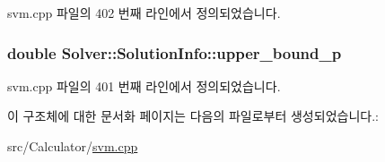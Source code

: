 svm.\+cpp 파일의 402 번째 라인에서 정의되었습니다.

\hypertarget{struct_solver_1_1_solution_info_a94c4cb7f402752326cc975ec57a8688f}{
\subsubsection[{upper\+\_\+bound\+\_\+p}]{\setlength{\rightskip}{0pt plus 5cm}double Solver\+::\+Solution\+Info\+::upper\+\_\+bound\+\_\+p}}\label{struct_solver_1_1_solution_info_a94c4cb7f402752326cc975ec57a8688f}


svm.\+cpp 파일의 401 번째 라인에서 정의되었습니다.



이 구조체에 대한 문서화 페이지는 다음의 파일로부터 생성되었습니다.\+:\begin{DoxyCompactItemize}
\item 
src/\+Calculator/\hyperlink{svm_8cpp}{svm.\+cpp}\end{DoxyCompactItemize}
